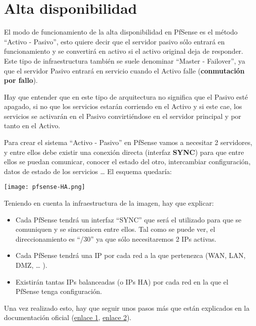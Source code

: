 
\chapter{Alta disponibilidad}
El modo de funcionamiento de la alta disponibilidad en PfSense es el método “Activo - Pasivo”, esto quiere decir que el servidor pasivo sólo entrará en funcionamiento y se convertirá en activo si el activo original deja de responder. Este tipo de infraestructura también se suele denominar “Master - Failover”, ya que el servidor Pasivo entrará en servicio cuando el Activo falle (\textbf{conmutación por fallo}).

Hay que entender que en este tipo de arquitectura no significa que el Pasivo esté apagado, si no que los servicios estarán corriendo en el Activo y si este cae, los servicios se activarán en el Pasivo convirtiéndose en el servidor principal y por tanto en el Activo.

Para crear el sistema “Activo - Pasivo” en PfSense vamos a necesitar 2 servidores, y entre ellos debe existir una conexión directa (interfaz \textbf{SYNC}) para que entre ellos se puedan comunicar, conocer el estado del otro, intercambiar configuración, datos de estado de los servicios … El esquema quedaría:

\begin{center}
    \vspace{-10pt}
    \texttt{[image: pfsense-HA.png]}
    \vspace{-20pt}
\end{center}


Teniendo en cuenta la infraestructura de la imagen, hay que explicar:

\begin{itemize}
    \item Cada PfSense tendrá un interfaz “SYNC” que será el utilizado para que se comuniquen y se sincronicen entre ellos. Tal como se puede ver, el direccionamiento es “/30” ya que sólo necesitaremos 2 IPs activas.
    \item Cada PfSense tendrá una IP por cada red a la que pertenezca (WAN, LAN, DMZ, … ).
    \item Existirán tantas IPs balanceadas (o IPs HA) por cada red en la que el PfSense tenga configuración.
\end{itemize}

Una vez realizado esto, hay que seguir unos pasos más que están explicados en la documentación oficial (\href{https://docs.netgate.com/pfsense/en/latest/solutions/reference/highavailability/clusterconfiguration.html}{enlace 1}, \href{https://docs.netgate.com/pfsense/en/latest/recipes/high-availability.html}{enlace 2}).


